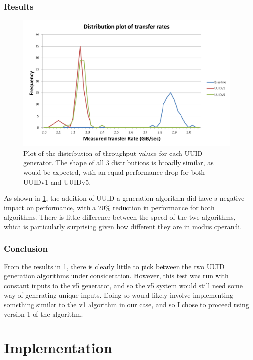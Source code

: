 \documentclass[a4paper,12pt,twoside,openright]{report}
\begin{document}
	\subsection{Results}
	
	\begin{figure}
		\includegraphics[width=\linewidth]{include/IPC-uuid-bench.png}
		\caption{Plot of the distribution of throughput values for each UUID generator. The shape of all 3 distributions is broadly similar, as would be expected, with an equal performance drop for both UUIDv1 and UUIDv5.}
		\label{fig:IPC-uuid-bench}
	\end{figure}
	
	As shown in \figurename{ \ref{fig:IPC-uuid-bench}}, the addition of UUID a generation algorithm did have a negative impact on performance, with a 20\% reduction in performance for both algorithms. There is little difference between the speed of the two algorithms, which is particularly surprising given how different they are in modus operandi.
	
	\subsection{Conclusion}
	
	From the results in \figurename{ \ref{fig:IPC-uuid-bench}}, there is clearly little to pick between the two UUID generation algorithms under consideration. However, this test was run with constant inputs to the v5 generator, and so the v5 system would still need some way of generating unique inputs. Doing so would likely involve implementing something similar to the v1 algorithm in our case, and so I chose to proceed using version 1 of the algorithm.
	
	
	\chapter{Implementation}
	
\end{document}
